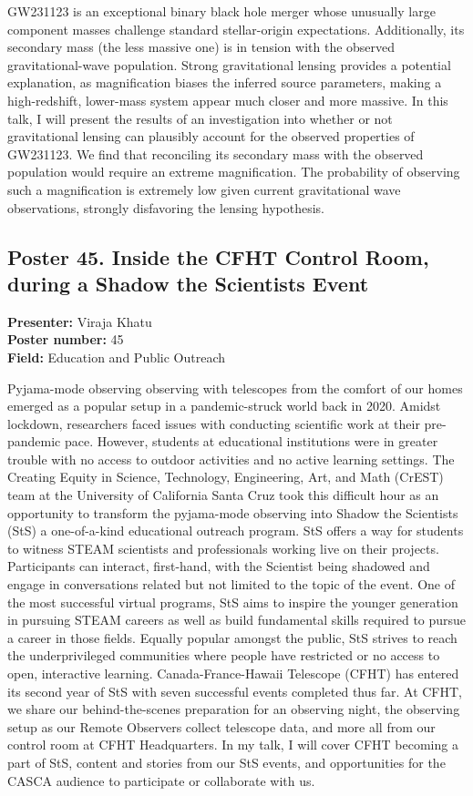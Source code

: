 GW231123 is an exceptional binary black hole merger whose unusually large component masses challenge standard stellar-origin expectations. Additionally, its secondary mass (the less massive one) is in tension with the observed gravitational-wave population. Strong gravitational lensing provides a potential explanation, as magnification biases the inferred source parameters, making a high-redshift, lower-mass system appear much closer and more massive. In this talk, I will present the results of an investigation into whether or not gravitational lensing can plausibly account for the observed properties of GW231123. We find that reconciling its secondary mass with the observed population would require an extreme magnification. The probability of observing such a magnification is extremely low given current gravitational wave observations, strongly disfavoring the lensing hypothesis.

\hypertarget{poster-abstract-talk-325}{}\label{poster-abstract-page-talk-325}
\subsection*{Poster 45. Inside the CFHT Control Room, during a Shadow the Scientists Event}
\textbf{Presenter:} Viraja Khatu\\
\textbf{Poster number:} 45\\
\textbf{Field:} Education and Public Outreach

Pyjama-mode observing observing with telescopes from the comfort of our homes emerged as a popular setup in a pandemic-struck world back in 2020. Amidst lockdown, researchers faced issues with conducting scientific work at their pre-pandemic pace. However, students at educational institutions were in greater trouble with no access to outdoor activities and no active learning settings. The Creating Equity in Science, Technology, Engineering, Art, and Math (CrEST) team at the University of California Santa Cruz took this difficult hour as an opportunity to transform the pyjama-mode observing into Shadow the Scientists (StS) a one-of-a-kind educational outreach program. StS offers a way for students to witness STEAM scientists and professionals working live on their projects. Participants can interact, first-hand, with the Scientist being shadowed and engage in conversations related but not limited to the topic of the event. One of the most successful virtual programs, StS aims to inspire the younger generation in pursuing STEAM careers as well as build fundamental skills required to pursue a career in those fields. Equally popular amongst the public, StS strives to reach the underprivileged communities where people have restricted or no access to open, interactive learning. Canada-France-Hawaii Telescope (CFHT) has entered its second year of StS with seven successful events completed thus far. At CFHT, we share our behind-the-scenes preparation for an observing night, the observing setup as our Remote Observers collect telescope data, and more all from our control room at CFHT Headquarters. In my talk, I will cover CFHT becoming a part of StS, content and stories from our StS events, and opportunities for the CASCA audience to participate or collaborate with us.

